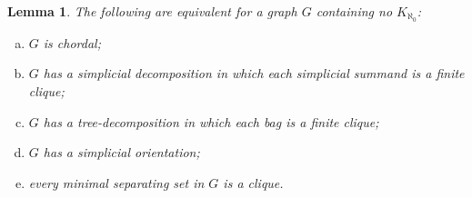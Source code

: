 \documentclass[a4paper,11pt]{article}
\theoremstyle{plain}
\newtheorem{lem}[thm]{Lemma}
\theoremstyle{definition}
\begin{document}
\begin{lem}
\label{ChordalCharacterisation}
The following are equivalent for a graph $G$ containing no $K_{\aleph_0}$:
\begin{enumerate}[(a)] 
\item\label{ChordalCharacterisationChordal} $G$ is chordal;
\item\label{ChordalCharacterisationSimpDec} $G$ has a simplicial decomposition in which each simplicial summand is a finite clique;  
\item\label{ChordalCharacterisationTreeDec} $G$ has a tree-decomposition in which each bag is a finite clique; 
\item\label{ChordalCharacterisationSimplicialOrientation} $G$ has a simplicial orientation;
\item\label{ChordalCharacterisationMinimalSep} every minimal separating set in $G$ is a clique. 
\end{enumerate}
\end{lem}
\end{document}
